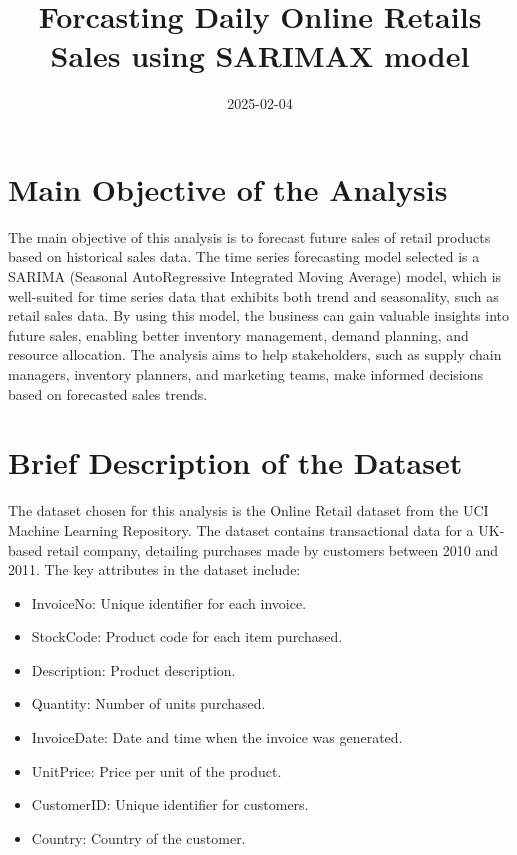 \documentclass[
  a4paper,
  DIV=11,
  numbers=noendperiod]{scrartcl}
\title{Forcasting Daily Online Retails Sales using SARIMAX model}
\author{}
\date{2025-02-04}
\providecommand{\tightlist}{%
  \setlength{\itemsep}{0pt}\setlength{\parskip}{0pt}}\usepackage{longtable,booktabs,array}
\renewcommand*\contentsname{Table of contents}
\newcommand\contentsname{Table of contents}
\begin{document}
\maketitle

\renewcommand*\contentsname{Table of Contents}
{
\hypersetup{linkcolor=}
\setcounter{tocdepth}{3}
\tableofcontents
}

\section{Main Objective of the
Analysis}\label{main-objective-of-the-analysis}

The main objective of this analysis is to forecast future sales of
retail products based on historical sales data. The time series
forecasting model selected is a SARIMA (Seasonal AutoRegressive
Integrated Moving Average) model, which is well-suited for time series
data that exhibits both trend and seasonality, such as retail sales
data. By using this model, the business can gain valuable insights into
future sales, enabling better inventory management, demand planning, and
resource allocation. The analysis aims to help stakeholders, such as
supply chain managers, inventory planners, and marketing teams, make
informed decisions based on forecasted sales trends.

\section{Brief Description of the
Dataset}\label{brief-description-of-the-dataset}

The dataset chosen for this analysis is the Online Retail dataset from
the UCI Machine Learning Repository. The dataset contains transactional
data for a UK-based retail company, detailing purchases made by
customers between 2010 and 2011. The key attributes in the dataset
include:

\begin{itemize}
\tightlist
\item
  InvoiceNo: Unique identifier for each invoice.
\item
  StockCode: Product code for each item purchased.
\item
  Description: Product description.
\item
  Quantity: Number of units purchased.
\item
  InvoiceDate: Date and time when the invoice was generated.
\item
  UnitPrice: Price per unit of the product.
\item
  CustomerID: Unique identifier for customers.
\item
  Country: Country of the customer.
\end{itemize}
\end{document}
